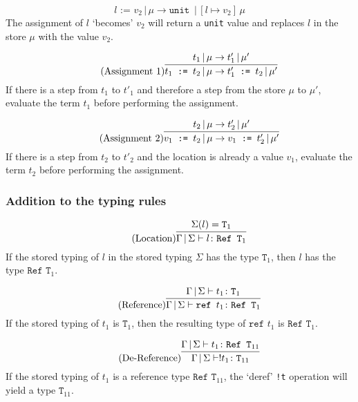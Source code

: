 \begin{equation*}
    \tag{Assignment}
    l \texttt{ := } v_2\,|\,\mu \rightarrow \texttt{unit }\,|\,[l \mapsto v_2]\,\mu
\end{equation*}
The assignment of $l$ `becomes' $v_2$ will return a \texttt{unit} value
and replaces $l$ in the store $\mu$ with the value $v_2$.

\begin{equation*}
    \tag{Assignment 1}
    \infer{
        t_1 \texttt{ := } t_2\,|\,\mu \rightarrow t'_1 \texttt{ := } t_2\,|\,\mu'
    }{
        t_1\,|\,\mu \rightarrow t'_1\,|\,\mu'
    }
\end{equation*}
If there is a step from $t_1$ to $t'_1$ and therefore a step
from the store $\mu$ to $\mu'$, evaluate the term $t_1$ before
performing the assignment.

\begin{equation*}
    \tag{Assignment 2}
    \infer{
        v_1 \texttt{ := } t_2\,|\,\mu \rightarrow v_1 \texttt{ := } t'_2\,|\,\mu'
    }{
        t_2\,|\,\mu \rightarrow t'_2\,|\,\mu'
    }
\end{equation*}
If there is a step from $t_2$ to $t'_2$ and the location
is already a value $v_1$, evaluate the term $t_2$ before
performing the assignment.

\subsubsection{Addition to the typing rules \cite{pierce2002ProgLang}}
\begin{equation*}
    \tag{Location}
    \infer{
        \Gamma\,|\,\Sigma \vdash l \colon \texttt{Ref T}_1
    }{
        \Sigma(l) = \texttt{T}_1
    }
\end{equation*}
If the stored typing of $l$ in the stored typing $\Sigma$ has
the type $\texttt{T}_1$, then $l$ has the type $\texttt{Ref T}_1$.

\begin{equation*}
    \tag{Reference}
    \infer{
        \Gamma\,|\,\Sigma \vdash \texttt{ref } t_1 \colon \texttt{Ref T}_1
    }{
        \Gamma\,|\,\Sigma \vdash t_1 \colon \texttt{T}_1
    }
\end{equation*}
If the stored typing of $t_1$ is $\texttt{T}_1$, then the resulting type
of $\texttt{ref } t_1$ is $\texttt{Ref T}_1$.

\begin{equation*}
    \tag{De-Reference}
    \infer{
        \Gamma\,|\,\Sigma \vdash !t_1 \colon \texttt{T}_{11}
    }{
        \Gamma\,|\,\Sigma \vdash t_1 \colon \texttt{Ref T}_{11}
    }
\end{equation*}
If the stored typing of $t_1$ is a reference type $\texttt{Ref T}_{11}$,
the `deref' \texttt{!t} operation will yield a type $\texttt{T}_{11}$.


